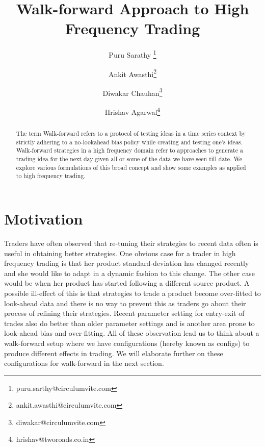 \documentclass[a4paper]{article}
\author[1]{Puru Sarathy \thanks{puru.sarthy@circulumvite.com}}
\author[1]{Ankit Awasthi\thanks{ankit.awasthi@circulumvite.com}}
\author[1]{Diwakar Chauhan\thanks{diwakar@circulumvite.com}}
\author[1]{Hrishav Agarwal\thanks{hrishav@tworoads.co.in}}
\affil[1]{qplum Investment Research}
\title{Walk-forward Approach to High Frequency Trading}
\date{}
\begin{document}
\maketitle

\begin{abstract}
The term Walk-forward refers to a protocol of testing ideas in a time series context by strictly adhering to a no-lookahead bias policy while creating and testing one's ideas. Walk-forward strategies in a high frequency domain refer to approaches to generate a trading idea for the next day given all or some of the data we have seen till date. We explore various formulations of this broad concept and show some examples as applied to high frequency trading.
\end{abstract}


\section{Motivation}

Traders have often observed that re-tuning their strategies to recent data often is useful in obtaining better strategies. One obvious case for a trader in high frequency trading is that her product standard-deviation has changed recently and she would like to adapt in a dynamic fashion to this change. The other case would be when her product has started following a different source product. A possible ill-effect of this is that strategies to trade a product become over-fitted to look-ahead data and there is no way to prevent this as traders go about their process of refining their strategies. Recent parameter setting for entry-exit of trades also do better than older parameter settings and is another area prone to look-ahead bias and over-fitting. All of these observation lead us to think about a walk-forward setup where we have configurations (hereby known as configs) to produce different effects in trading. We will elaborate further on these configurations for walk-forward in the next section.
\end{document}
